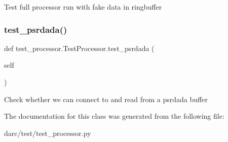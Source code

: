 \begin{DoxyVerb}Test full processor run with fake data in ringbuffer
\end{DoxyVerb}
 \mbox{\label{classtest__processor_1_1_test_processor_ad54549f2072bf9c895bdd3d466cd4e77}} 
\subsubsection{\texorpdfstring{test\_psrdada()}{test\_psrdada()}}
{\footnotesize\ttfamily def test\+\_\+processor.\+Test\+Processor.\+test\+\_\+psrdada (\begin{DoxyParamCaption}\item[{}]{self }\end{DoxyParamCaption})}

\begin{DoxyVerb}Check whether we can connect to and read from a psrdada buffer
\end{DoxyVerb}
 

The documentation for this class was generated from the following file\+:\begin{DoxyCompactItemize}
\item 
darc/test/test\+\_\+processor.\+py\end{DoxyCompactItemize}
